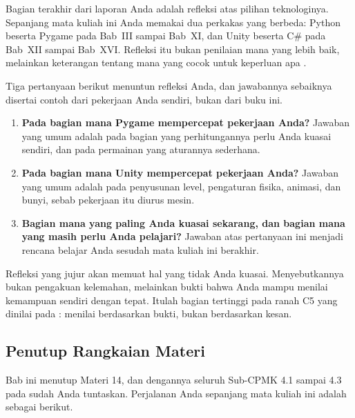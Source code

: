 Bagian terakhir dari laporan Anda adalah refleksi atas pilihan teknologinya.
Sepanjang mata kuliah ini Anda memakai dua perkakas yang berbeda: Python
beserta Pygame pada Bab~III sampai Bab~XI, dan Unity beserta C\# pada Bab~XII
sampai Bab~XVI. Refleksi itu bukan penilaian mana yang lebih baik, melainkan
keterangan tentang mana yang cocok untuk keperluan apa \cite{rokania-unity}.

Tiga pertanyaan berikut menuntun refleksi Anda, dan jawabannya sebaiknya
disertai contoh dari pekerjaan Anda sendiri, bukan dari buku ini.

\begin{enumerate}
  \item \textbf{Pada bagian mana Pygame mempercepat pekerjaan Anda?} Jawaban
        yang umum adalah pada bagian yang perhitungannya perlu Anda kuasai
        sendiri, dan pada permainan yang aturannya sederhana.
  \item \textbf{Pada bagian mana Unity mempercepat pekerjaan Anda?} Jawaban
        yang umum adalah pada penyusunan level, pengaturan fisika, animasi, dan
        bunyi, sebab pekerjaan itu diurus mesin.
  \item \textbf{Bagian mana yang paling Anda kuasai sekarang, dan bagian mana
        yang masih perlu Anda pelajari?} Jawaban atas pertanyaan ini menjadi
        rencana belajar Anda sesudah mata kuliah ini berakhir.
\end{enumerate}

\begin{catatabox}
Refleksi yang jujur akan memuat hal yang tidak Anda kuasai. Menyebutkannya
bukan pengakuan kelemahan, melainkan bukti bahwa Anda mampu menilai kemampuan
sendiri dengan tepat. Itulah bagian tertinggi pada ranah C5 yang dinilai pada
: menilai berdasarkan bukti, bukan berdasarkan kesan.
\end{catatabox}

\subsection{Penutup Rangkaian Materi}

Bab ini menutup Materi 14, dan dengannya seluruh Sub-CPMK 4.1 sampai 4.3 pada
 sudah Anda tuntaskan. Perjalanan Anda sepanjang mata kuliah ini adalah
sebagai berikut.

